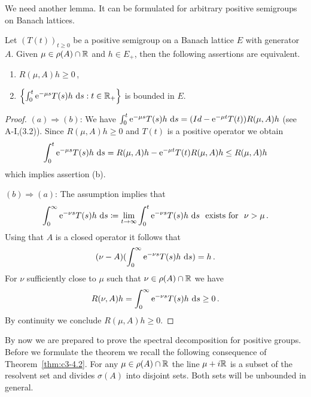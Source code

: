 We need another lemma. It can be formulated for arbitrary positive
semigroups on Banach lattices.

\begin{lemma}\label{lem:c3-4.7}
Let $(T(t))_{t \geq 0}$ be a positive semigroup on a Banach
lattice $E$ with generator $A$. Given $\mu \in \rho(A) \cap \mathbb{R} $ and $h \in E_+$, then the following assertions are equivalent.
\begin{enumerate}[\upshape (a)]
	\item 
	$R(\mu,A)h \geq 0$\,,

	\item 
	$\left\{\int_{0}^{t} \mathrm{e}^{-\mu s}T(s)h \, \mathop{}\!\mathrm{d}{s} : t \in \mathbb{R} _+\right\}$ is bounded in $E$.
\end{enumerate}
\end{lemma}

\begin{proof}
$(a)\Rightarrow(b)$: We have
$\int_{0}^{t} \mathrm{e}^{-\mu s}T(s)h \, \mathop{}\!\mathrm{d}{s} = (Id - \mathrm{e}^{-\mu t}T(t))R(\mu,A)h$ (see A-I,(3.2)).
Since $R(\mu,A)h \geq 0$ and $T(t)$ is a positive operator we obtain
\[
\int_{0}^{t} \mathrm{e}^{-\mu s}T(s)h \, \mathop{}\!\mathrm{d}{s} = R(\mu,A)h - \mathrm{e}^{-\mu t}T(t)R(\mu,A)h \leq R(\mu,A)h
\] 
which implies assertion (b).

$(b)\Rightarrow(a)$: The assumption implies that 
\[
\int_{0}^{\infty} \mathrm{e}^{-\nu s}T(s)h \, \ds \coloneqq 
\lim_{t \to \infty} \int_{0}^{t} \mathrm{e}^{-\nu s}T(s)h \, \ds \ \text{ exists for } \ \nu > \mu\,. 
\]
Using that $A$ is a closed operator it follows that 
\[
(\nu - A)(\int_{0}^{\infty} \mathrm{e}^{-\nu s}T(s)h \, \mathop{}\!\mathrm{d}{s}) = h\,.
\]
For $\nu$
sufficiently close to $\mu$ such that $\nu \in \rho(A) \cap \mathbb{R} $ we have 
\[ 
R(\nu,A)h = \int_{0}^{\infty} \mathrm{e}^{-\nu s}T(s)h \, \mathop{}\!\mathrm{d}{s} \geq 0\,. 
\] 
By continuity we conclude $R(\mu,A)h \geq 0$.
\end{proof}

By now we are prepared to prove the spectral decomposition for positive groups. Before we formulate the theorem we recall the following
consequence of Theorem~\ref{thm:c3-4.2}. For any $\mu \in \rho(A) \cap \mathbb{R} $ the line $\mu+i\mathbb{R} $ is a
subset of the resolvent set and divides $\sigma(A)$ into disjoint sets.
Both sets will be unbounded in general.


